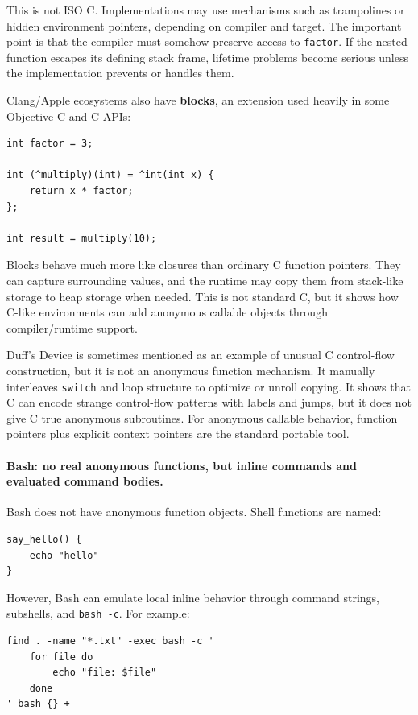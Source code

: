 This is not ISO C. Implementations may use mechanisms such as trampolines or hidden environment pointers, depending on compiler and target. The important point is that the compiler must somehow preserve access to \texttt{factor}. If the nested function escapes its defining stack frame, lifetime problems become serious unless the implementation prevents or handles them.

Clang/Apple ecosystems also have \textbf{blocks}, an extension used heavily in some Objective-C and C APIs:

\begin{verbatim}
int factor = 3;

int (^multiply)(int) = ^int(int x) {
    return x * factor;
};

int result = multiply(10);
\end{verbatim}

Blocks behave much more like closures than ordinary C function pointers. They can capture surrounding values, and the runtime may copy them from stack-like storage to heap storage when needed. This is not standard C, but it shows how C-like environments can add anonymous callable objects through compiler/runtime support.

Duff's Device is sometimes mentioned as an example of unusual C control-flow construction, but it is not an anonymous function mechanism. It manually interleaves \texttt{switch} and loop structure to optimize or unroll copying. It shows that C can encode strange control-flow patterns with labels and jumps, but it does not give C true anonymous subroutines. For anonymous callable behavior, function pointers plus explicit context pointers are the standard portable tool.

\paragraph{Bash: no real anonymous functions, but inline commands and evaluated command bodies.}

Bash does not have anonymous function objects. Shell functions are named:

\begin{verbatim}
say_hello() {
    echo "hello"
}
\end{verbatim}

However, Bash can emulate local inline behavior through command strings, subshells, and \texttt{bash -c}. For example:

\begin{verbatim}
find . -name "*.txt" -exec bash -c '
    for file do
        echo "file: $file"
    done
' bash {} +
\end{verbatim}

